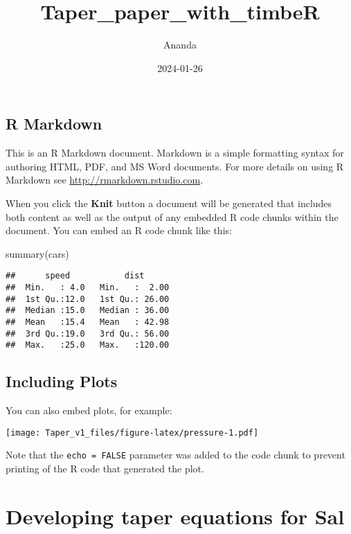 \documentclass[
]{article}
\title{Taper\_paper\_with\_timbeR}
\author{Ananda}
\date{2024-01-26}
\newenvironment{Shaded}{\begin{snugshade}}{\end{snugshade}}
\newcommand{\FunctionTok}[1]{\textcolor[rgb]{0.00,0.00,0.00}{#1}}
\newcommand{\NormalTok}[1]{#1}
\begin{document}
\maketitle

\hypertarget{r-markdown}{%
\subsection{R Markdown}\label{r-markdown}}

This is an R Markdown document. Markdown is a simple formatting syntax
for authoring HTML, PDF, and MS Word documents. For more details on
using R Markdown see \url{http://rmarkdown.rstudio.com}.

When you click the \textbf{Knit} button a document will be generated
that includes both content as well as the output of any embedded R code
chunks within the document. You can embed an R code chunk like this:

\begin{Shaded}
\begin{Highlighting}[]
\FunctionTok{summary}\NormalTok{(cars)}
\end{Highlighting}
\end{Shaded}

\begin{verbatim}
##      speed           dist       
##  Min.   : 4.0   Min.   :  2.00  
##  1st Qu.:12.0   1st Qu.: 26.00  
##  Median :15.0   Median : 36.00  
##  Mean   :15.4   Mean   : 42.98  
##  3rd Qu.:19.0   3rd Qu.: 56.00  
##  Max.   :25.0   Max.   :120.00
\end{verbatim}

\hypertarget{including-plots}{%
\subsection{Including Plots}\label{including-plots}}

You can also embed plots, for example:

\texttt{[image: Taper\_v1\_files/figure-latex/pressure-1.pdf]}

Note that the \texttt{echo\ =\ FALSE} parameter was added to the code
chunk to prevent printing of the R code that generated the plot.

\hypertarget{developing-taper-equations-for-sal}{%
\section{Developing taper equations for
Sal}\label{developing-taper-equations-for-sal}}
\end{document}
